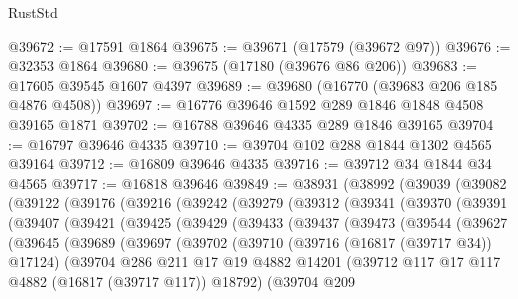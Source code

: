 \begin{lexlean}{RustStd}
\begin{coremodule}
@39672 := @17591 @1864
@39675 := @39671 (@17579 (@39672 @97))
@39676 := @32353 @1864
@39680 := @39675 (@17180 (@39676 @86 @206))
@39683 := @17605 @39545 @1607 @4397
@39689 := @39680 (@16770 (@39683 @206 @185 @4876 @4508))
@39697 := @16776 @39646 @1592 @289 @1846 @1848 @4508 @39165 @1871
@39702 := @16788 @39646 @4335 @289 @1846 @39165
@39704 := @16797 @39646 @4335
@39710 := @39704 @102 @288 @1844 @1302 @4565 @39164
@39712 := @16809 @39646 @4335
@39716 := @39712 @34 @1844 @34 @4565
@39717 := @16818 @39646
@39849 := @38931
    (@38992
      (@39039
        (@39082
          (@39122
            (@39176
              (@39216
                (@39242
                  (@39279
                    (@39312
                      (@39341
                        (@39370
                          (@39391
                            (@39407
                              (@39421
                                (@39425
                                  (@39429
                                    (@39433
                                      (@39437
                                        (@39473
                                          (@39544
                                            (@39627
                                              (@39645
                                                (@39689
                                                  (@39697
                                                    (@39702
                                                      (@39710
                                                        (@39716 (@16817 (@39717 @34)) @17124)
                                                        (@39704
                                                          @286
                                                          @211
                                                          @17
                                                          @19
                                                          @4882
                                                          @14201
                                                          (@39712
                                                            @117
                                                            @17
                                                            @117
                                                            @4882
                                                            (@16817 (@39717 @117))
                                                            @18792)
                                                          (@39704
                                                            @209

\end{coremodule}
\end{lexlean}

